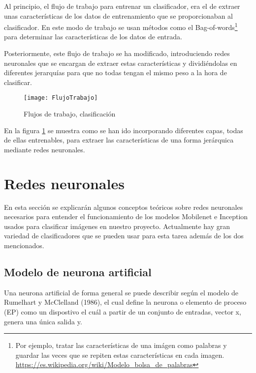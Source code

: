 Al principio, el flujo de trabajo para entrenar un clasificador, era el de extraer unas características de los datos de entrenamiento que se proporcionaban al clasificador. En este modo de trabajo se usan métodos como el Bag-of-words\footnote{Por ejemplo, tratar las características de una imágen como palabras y guardar las veces que se repiten estas características en cada imagen. \url{https://es.wikipedia.org/wiki/Modelo_bolsa_de_palabras}} para determinar las características de los datos de entrada.

Posteriormente, este flujo de trabajo se ha modificado, introduciendo redes neuronales que se encargan de extraer estas características y dividiéndolas en diferentes jerarquías para que no todas tengan el mismo peso a la hora de clasificar.

\begin{figure}[h]
    \begin{center}%
        \begin{center}%
          \texttt{[image: FlujoTrabajo]}%
          \caption{Flujos de trabajo, clasificación}%
          \label{figFlujo}%
        \end{center}%
  	\end{center}%
\end{figure}%

En la figura \ref{figFlujo} se muestra como se han ido incorporando diferentes capas, todas de ellas entrenables, para extraer las características de una forma jerárquica mediante redes neuronales.

\newpage

\section{Redes neuronales}

En esta sección se explicarán algunos conceptos teóricos sobre redes neuronales necesarios para entender el funcionamiento de los modelos Mobilenet e Inception usados para clasificar imágenes en nuestro proyecto. Actualmente hay gran variedad de clasificadores que se pueden usar para esta tarea además de los dos mencionados.

\subsection{Modelo de neurona artificial}

Una neurona artificial de forma general se puede describir según el modelo de Rumelhart y McClelland (1986), el cual define la neurona o elemento de proceso (EP) como un dispostivo el cuál a partir de un conjunto de entradas, vector x, genera una única salida y. \cite{redesNeurnalesUno}

